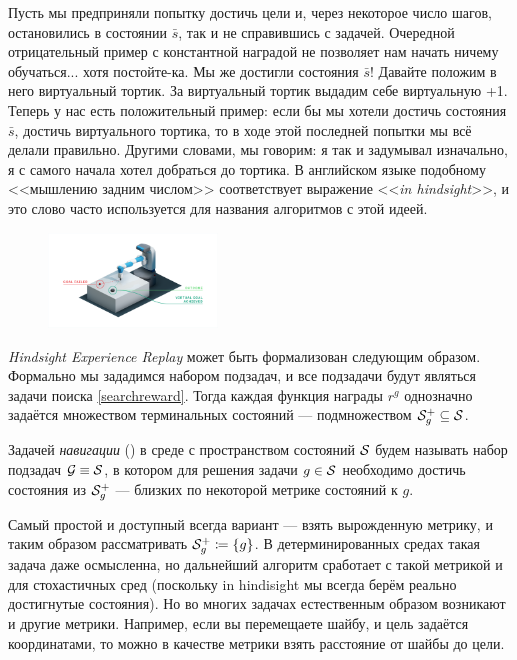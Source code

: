 Пусть мы предприняли попытку достичь цели и, через некоторое число шагов, остановились в состоянии $\bar{s}$, так и не справившись с задачей. Очередной отрицательный пример с константной наградой не позволяет нам начать ничему обучаться... хотя постойте-ка. Мы же достигли состояния $\bar{s}$! Давайте положим в него виртуальный тортик. За виртуальный тортик выдадим себе виртуальную +1. Теперь у нас есть положительный пример: если бы мы хотели достичь состояния $\bar{s}$, достичь виртуального тортика, то в ходе этой последней попытки мы всё делали правильно. Другими словами, мы говорим: я так и задумывал изначально, я с самого начала хотел добраться до тортика. В английском языке подобному <<мышлению задним числом>> соответствует выражение <<\emph{in hindsight}>>, и это слово часто используется для названия алгоритмов с этой идеей. 

\begin{figure}
\vspace{-0.5cm}
\begin{adjustwidth}{-0.4cm}{}
\includegraphics[width=0.4\textwidth]{Images/virtualgoal.png}
\end{adjustwidth}
\end{figure}

\emph{Hindsight Experience Replay} может быть формализован следующим образом. Формально мы зададимся набором подзадач, и все подзадачи будут являться задачи поиска \eqref{searchreward}. Тогда каждая функция награды $r^g$ однозначно задаётся множеством терминальных состояний --- подмножеством $\mathcal{S}^+_g \subseteq \mathcal{S}$. 

\begin{definition}
Задачей \emph{навигации} () в среде с пространством состояний $\mathcal{S}$ будем называть набор подзадач $\mathcal{G} \equiv \mathcal{S}$, в котором для решения задачи $g \in \mathcal{S}$ необходимо достичь состояния из $\mathcal{S}^+_g$ --- близких по некоторой метрике состояний к $g$.
\end{definition}

\begin{example}
Самый простой и доступный всегда вариант --- взять вырожденную метрику, и таким образом рассматривать $\mathcal{S}^+_g \coloneqq \{g\}$. В детерминированных средах такая задача даже осмысленна, но дальнейший алгоритм сработает с такой метрикой и для стохастичных сред (поскольку in hindisight мы всегда берём реально достигнутые состояния). Но во многих задачах естественным образом возникают и другие метрики. Например, если вы перемещаете шайбу, и цель задаётся координатами, то можно в качестве метрики взять расстояние от шайбы до цели. 
\end{example}

